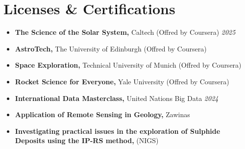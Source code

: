 \documentclass[letterpaper,11pt]{article}
\begin{document}
	\section{Licenses \& Certifications}
	\begin{itemize}[left=0pt, label={}, topsep=7.5pt, partopsep=0pt, itemsep=6pt, parsep=0pt]
	\item \textbf{The Science of the Solar System,} Caltech (Offred by Coursera) \hfill \textit{2025}
\end{itemize}
\vspace{-1.2em}
\begin{itemize}[left=0pt, label={}, topsep=7.5pt, partopsep=0pt, itemsep=6pt, parsep=0pt]
	\item \textbf{AstroTech,} The University of Edinburgh (Offred by Coursera)
\end{itemize}
\vspace{-1.2em}
\begin{itemize}[left=0pt, label={}, topsep=7.5pt, partopsep=0pt, itemsep=6pt, parsep=0pt]
	\item \textbf{Space Exploration,} Technical University of Munich (Offred by Coursera)
\end{itemize}
\vspace{-1.2em}
\begin{itemize}[left=0pt, label={}, topsep=7.5pt, partopsep=0pt, itemsep=6pt, parsep=0pt]
	\item \textbf{Rocket Science for Everyone,} Yale University (Offred by Coursera)
\end{itemize}
\vspace{-1.2em}
	\begin{itemize}[left=0pt, label={}, topsep=7.5pt, partopsep=0pt, itemsep=6pt, parsep=0pt]
		\item \textbf{International Data Masterclass,} United Nations Big Data  \hfill \textit{2024}
	\end{itemize}
	\vspace{-1.2em} 
	\begin{itemize}[left=0pt, label={}, topsep=7.5pt, partopsep=0pt, itemsep=6pt, parsep=0pt]
		\item \textbf{Application of Remote Sensing in Geology,} Zawinas
	\end{itemize}
	\vspace{-1.2em}
	\begin{itemize}[left=0pt, label={}, topsep=7.5pt, partopsep=0pt, itemsep=6pt, parsep=0pt]
		\item \textbf{Investigating practical issues in the exploration of Sulphide Deposits using the IP-RS method,} (NIGS)\footnotemark[1]
	\end{itemize}
\end{document}
